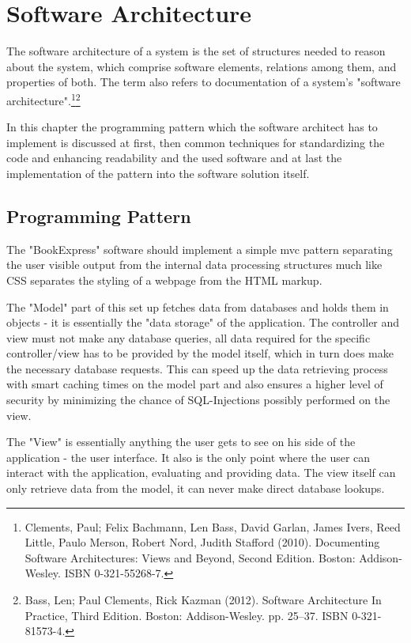 \documentclass[11pt,a4paper,oneside,svgnames]{report}
\begin{document}
\chapter{Software Architecture}
The software architecture of a system is the set of structures needed to reason about the system, which comprise software elements, relations among them, and properties of both. The term also refers to documentation of a system's "software architecture".\footnote{ Clements, Paul; Felix Bachmann, Len Bass, David Garlan, James Ivers, Reed Little, Paulo Merson, Robert Nord, Judith Stafford (2010). Documenting Software Architectures: Views and Beyond, Second Edition. Boston: Addison-Wesley. ISBN 0-321-55268-7.}\footnote{Bass, Len; Paul Clements, Rick Kazman (2012). Software Architecture In Practice, Third Edition. Boston: Addison-Wesley. pp. 25–37. ISBN 0-321-81573-4.}

In this chapter the programming pattern which the software architect has to implement is discussed at first, then common techniques for standardizing the code and enhancing readability and the used software and at last the implementation of the pattern into the software solution itself.

\section{Programming Pattern}
The "BookExpress" software should implement a simple \gls{mvc} pattern separating the user visible output from the internal data processing structures much like CSS separates the styling of a webpage from the HTML markup.

The "Model" part of this set up fetches data from databases and holds them in objects - it is essentially the "data storage" of the application. The controller and view must not make any database queries, all data required for the specific controller/view has to be provided by the model itself, which in turn does make the necessary database requests. This can speed up the data retrieving process with smart caching times on the model part and also ensures a higher level of security by minimizing the chance of SQL-Injections possibly performed on the view.

The "View" is essentially anything the user gets to see on his side of the application - the user interface. It also is the only point where the user can interact with the application, evaluating and providing data. The view itself can only retrieve data from the model, it can never make direct database lookups.
\end{document}
